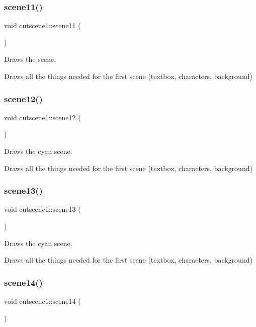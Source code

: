 \subsubsection{\texorpdfstring{scene11()}{scene11()}}
{\footnotesize\ttfamily void cutscene1\+::scene11 (\begin{DoxyParamCaption}{ }\end{DoxyParamCaption})}



Draws the scene. 

Draws all the things needed for the first scene (textbox, characters, background) \mbox{\label{classcutscene1_a6c57956c7ec2eb301b2f093a1b3c9925}} 
\subsubsection{\texorpdfstring{scene12()}{scene12()}}
{\footnotesize\ttfamily void cutscene1\+::scene12 (\begin{DoxyParamCaption}{ }\end{DoxyParamCaption})}



Draws the cyan scene. 

Draws all the things needed for the first scene (textbox, characters, background) \mbox{\label{classcutscene1_a70656ea0e35919324bff0a85f81a5a92}} 
\subsubsection{\texorpdfstring{scene13()}{scene13()}}
{\footnotesize\ttfamily void cutscene1\+::scene13 (\begin{DoxyParamCaption}{ }\end{DoxyParamCaption})}



Draws the cyan scene. 

Draws all the things needed for the first scene (textbox, characters, background) \mbox{\label{classcutscene1_ad361d93d7c2c69c96bece8449221ac41}} 
\subsubsection{\texorpdfstring{scene14()}{scene14()}}
{\footnotesize\ttfamily void cutscene1\+::scene14 (\begin{DoxyParamCaption}{ }\end{DoxyParamCaption})}



